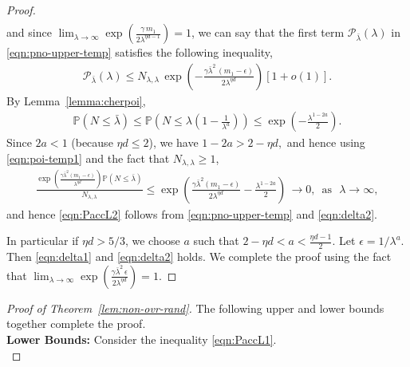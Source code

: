 \documentclass[11pt]{article}
\newcommand{\pp}{\mathbb{P}}
\newcommand{\lt}{\left}
\newcommand{\rt}{\right}
\begin{document}
\begin{appendices}
\begin{proof}
\begin{align}
\end{align}
and since $\lim_{\lambda \rightarrow \infty}\exp\left( \frac{\gamma \, m_1}{2\lambda^{\eta d -1}} \rt)= 1$,
we can say that the first term $\mathcal{P}_{\bar{\lambda}}\lt(\lambda\rt)$ in \eqref{eqn:pno-upper-temp} satisfies the following inequality,
\begin{align*}
   \mathcal{P}_{\bar{\lambda}}\lt(\lambda\rt)\leq N_{\lambda, \lambda}\,\exp\left( - \frac{\gamma \bar{\lambda}^2\, (m_1 - \epsilon)}{2\lambda^{\eta d}} \right) \lt[1  + o(1)\rt].
\end{align*}
 By Lemma~\ref{lemma:cherpoi},
\begin{align}
\label{eqn:poi-temp1}
 \pp\lt(N \leq \bar{\lambda}\rt) \leq \pp\lt(N \leq \lambda\lt(1 - \frac{1}{\lambda^a} \rt)\rt) \leq \exp\lt( - \frac{\lambda^{1 - 2a}}{2}\rt).
\end{align}
Since $2a < 1$ (because $\eta d \leq 2$),  we have $1 - 2a > 2 - \eta d,$ and hence using \eqref{eqn:poi-temp1} and the fact that $N_{\lambda, \lambda} \geq 1$,
\begin{align}
 \label{eqn:delta2}
  \frac{\exp\left(\frac{\gamma \bar{\lambda}^2 (m_1 - \epsilon)}{\lambda^{\eta d}}\right)\pp\lt(N \leq \bar{\lambda}\rt)}{N_{\lambda, \lambda}}
   \leq \exp\left(\frac{ \gamma \bar{\lambda}^2 (m_1 - \epsilon)}{2\lambda^{\eta d}} - \frac{\lambda^{1 - 2a}}{2}\right)\,
   \longrightarrow 0,\, \text{  as  }\, \, \lambda \rightarrow \infty,
 \end{align}
and hence \eqref{eqn:PaccL2} follows from \eqref{eqn:pno-upper-temp} and \eqref{eqn:delta2}. 

In particular if $\eta d > 5/3$, we choose $a$ such that $2 - \eta d < a < \frac{\eta d - 1}{2}$. Let $\epsilon = 1/\lambda^a$.
Then \eqref{eqn:delta1} and \eqref{eqn:delta2} holds. We complete the proof using the fact that $\lim_{\lambda \rightarrow \infty}\exp\left( \frac{\gamma \bar{\lambda}^2\, \epsilon}{2\lambda^{\eta d}} \right) = 1$.
\end{proof}

\begin{proof}[Proof of Theorem~\ref{lem:non-ovr-rand}]
The following upper and lower bounds together complete the proof.\\

\noindent
{\bf Lower Bounds:} Consider the inequality \eqref{eqn:PaccL1}.\\


\end{proof}
\end{appendices}
\end{document}
